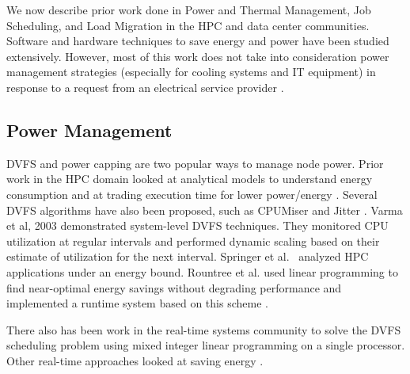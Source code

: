 We now describe prior work done in Power and Thermal Management, Job Scheduling, and Load Migration in the HPC and data center communities. Software and hardware techniques to save energy and power have been studied extensively. However, most of this work does not take into consideration power management strategies (especially for cooling systems and IT equipment) in response to a request from an electrical service provider \cite{Ghatikar2012a}.

\subsection{Power Management}
DVFS and power capping are two popular ways to manage node power. Prior work in the HPC domain looked at analytical models to understand energy consumption \cite{SpringerPPoPP2006,GeICPP2007,LiHPCA2006} and at trading execution time for lower power/energy \cite{CameronSC2005,HsuSC2005}. Several DVFS algorithms have also been proposed, such as CPUMiser \cite{GeICPP2007} and Jitter \cite{KappiahSC2005}. Varma et al, 2003 \cite{varma_control-theoretic_2003} demonstrated system-level DVFS techniques. They monitored CPU utilization at regular intervals and performed dynamic scaling based on their estimate of utilization for the next interval. Springer et al.~\cite{springer:06} analyzed HPC applications under an energy bound. Rountree et al. used linear programming to find near-optimal energy savings without degrading performance \cite{rountree:07} and implemented a runtime system based on this scheme \cite{rountree:09}. 

There also has been work in the real-time systems community to solve the DVFS scheduling problem using mixed integer linear programming on a single processor\cite{IshiharaISLPED1998,SaputraLCTES2002,SwaminathanRTSS2000,SwaminathanASPDAC2001}. Other real-time approaches looked at saving energy \cite{MoncusiRTSS2003,MochockiICCAD2002,MochockiRTAS2005,ZhuTPDS2003,ZhangDAC2002}. 


